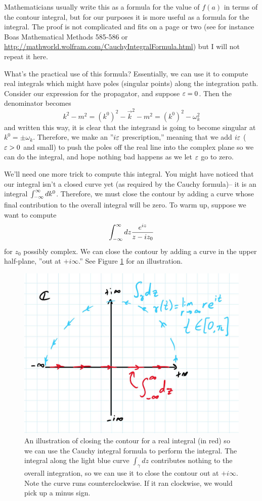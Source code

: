 Mathematicians usually write this as a formula for the value of $f(a)$ in terms of the contour integral, but for our purposes it is more useful as a formula for the integral. The proof is not complicated and fits on a page or two (see for instance Boas Mathematical Methods 585-586 or \url{http://mathworld.wolfram.com/CauchyIntegralFormula.html}) but I will not repeat it here.

What's the practical use of this formula? Essentially, we can use it to compute real integrals which might have poles (singular points) along the integration path. Consider our expression for the propagator, and suppose $\varepsilon=0$. Then the denominator becomes $$k^2-m^2=(k^0)^2-\vec{k}^2-m^2=(k^0)^2- \omega_k^2$$
and written this way, it is clear that the integrand is going to become singular at $k^0=\pm \omega_k$. Therefore, we make an ''$i\varepsilon$ prescription,'' meaning that we add $i\varepsilon$ ($\varepsilon>0$ and small) to push the poles off the real line into the complex plane so we can do the integral, and hope nothing bad happens as we let $\varepsilon$ go to zero.

We'll need one more trick to compute this integral. You might have noticed that our integral isn't a closed curve yet (as required by the Cauchy formula)-- it is an integral $\int_{-\infty}^\infty dk^0$. Therefore, we must close the contour by adding a curve whose final contribution to the overall integral will be zero. To warm up, suppose we want to compute
$$\int_{-\infty}^\infty dz \frac{e^{iz}}{z-i z_0}$$
for $z_0$ possibly complex. We can close the contour by adding a curve in the upper half-plane, ''out at $+i\infty$.'' See Figure \ref{fig_contour} for an illustration. 

\begin{figure}\label{fig_contour}
\includegraphics[width=0.8\linewidth]{2018/10/20180704_1.JPG}
\caption{An illustration of closing the contour for a real integral (in red) so we can use the Cauchy integral formula to perform the integral. The integral along the light blue curve $\int_\gamma dz$ contributes nothing to the overall integration, so we can use it to close the contour out at $+i\infty$. Note the curve runs counterclockwise. If it ran clockwise, we would pick up a minus sign.}
\end{figure}

